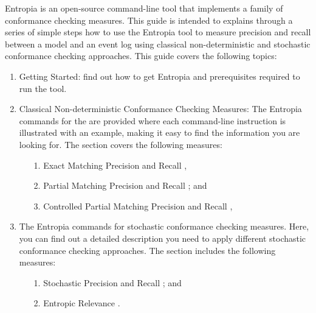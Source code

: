 Entropia is an open-source command-line tool that implements a family of conformance checking measures. This guide is intended to explains through a series of simple steps how to use the Entropia tool to measure precision and recall between a model and an event log using classical non-deterministic and stochastic conformance checking approaches. This guide covers the following topics:

\begin{enumerate}
\itemsep0em 
\item Getting Started: find out how to get Entropia and prerequisites required to run the tool.  
\item Classical Non-deterministic Conformance Checking Measures: The Entropia commands for the are provided where each command-line instruction is illustrated with an example, making it easy to find the information you are looking for. The section covers the following measures: 
\begin{enumerate}
\itemsep0em 
\item[1.] Exact Matching Precision and Recall \cite{Polyvyanyy2020TOSEM}, 
\item[2.] Partial Matching Precision and Recall \cite{PolyvyanyyK2019}; and
\item[3.] Controlled Partial Matching Precision and Recall \cite{KalenkovaP2020},
\end{enumerate}
\item The Entropia commands for stochastic conformance checking measures. Here, you can find out a detailed description you need to apply different stochastic conformance checking approaches. The section includes the following measures: 
\begin{enumerate}
\item[1.] Stochastic Precision and Recall  \cite{Leemans2020}; and
\item[2.] Entropic Relevance \cite{abs-2007-09310}. 
\end{enumerate}
\end{enumerate}
